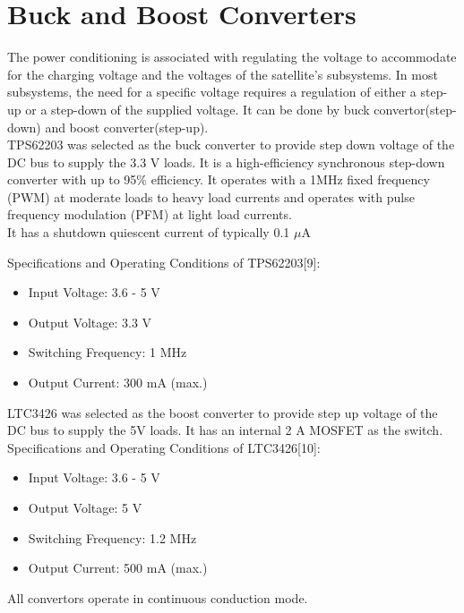 \section[Switching Regulators]{Buck and Boost Converters}
The power conditioning is associated with regulating the voltage to accommodate
for the charging voltage and the voltages of the satellite's subsystems. In most
subsystems, the need for a specific voltage requires a regulation of either a step-up
or a step-down of the supplied voltage. It can be done by buck
convertor(step-down) and boost converter(step-up).\\
TPS62203 was selected as the buck converter to provide step down voltage of the DC bus to supply the 3.3 V loads. It is a high-efficiency synchronous step-down converter with up to 95\% efficiency. It operates with a 1MHz fixed frequency (PWM) at moderate loads to heavy load currents and operates with pulse
frequency modulation (PFM) at light load currents.\\

It has a shutdown quiescent current of typically 0.1 {$\mu$}A

 Specifications and Operating Conditions of TPS62203[9]:
\begin{itemize}
	\item Input Voltage: 3.6 - 5 V
	\item Output Voltage:  3.3 V
	\item Switching Frequency: 1 MHz
	\item Output Current: 300 mA (max.)
\end{itemize}


 LTC3426 was selected as the boost converter to provide step up voltage of the DC bus to supply the 5V loads. It has an internal 2 A MOSFET as the switch.\\
 
  Specifications and Operating Conditions of LTC3426[10]:
 \begin{itemize}
 	\item Input Voltage: 3.6 - 5 V
 	\item Output Voltage: 5 V
 	\item Switching Frequency: 1.2 MHz
 	\item Output Current: 500 mA (max.)
 \end{itemize}
All convertors operate in continuous conduction mode.\\

